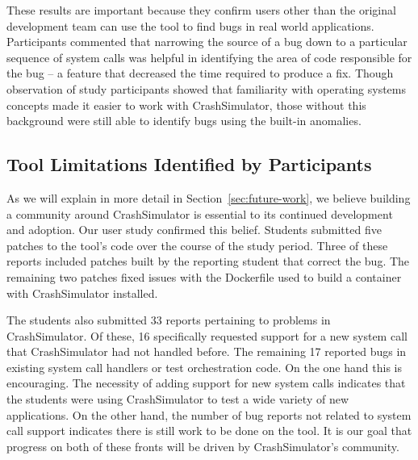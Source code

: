 These results are important
because they confirm
users other than the original development team
can use the tool to find bugs in real world applications.
Participants commented that narrowing the source of a bug
down to a particular sequence of system calls
was helpful in identifying the area of
code responsible for the bug -- a feature
that decreased the time required to produce a fix.
Though observation of study participants
showed that familiarity with operating systems concepts
made it easier to work with CrashSimulator,
those without this background were still able to identify bugs using the
built-in anomalies.

\subsection{Tool Limitations Identified by Participants}
\label{subsec:crashsim-patches}

As we will explain in more detail in Section~\ref{sec:future-work},
we believe building a community around CrashSimulator is essential to its
continued development and adoption.  Our user study confirmed this belief.
Students submitted five patches
to the tool's code over the
course of the study period.
Three of these reports included patches built by the reporting student that
correct the bug.
The remaining two patches fixed issues with the
Dockerfile used to build a container with CrashSimulator installed.

The students also submitted 33 reports pertaining to problems in CrashSimulator.
Of these, 16 specifically requested support for a new system call that
CrashSimulator had not handled before.  The remaining 17 reported bugs in
existing system call handlers or test orchestration code.
On the one hand this is encouraging.  The necessity of adding
support for new system calls
indicates that the students were
using CrashSimulator to test a wide variety of new applications.
On the other hand, the number of bug reports not related to system call support
indicates there is still work to be done on the tool.
It is our goal that progress on both of these fronts will be driven by
CrashSimulator's community.

